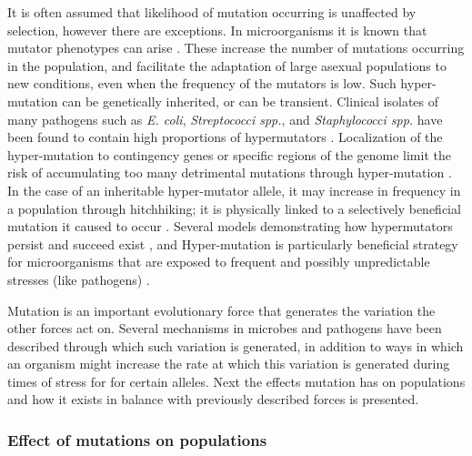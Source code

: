 It is often assumed that likelihood of mutation occurring is unaffected by selection, however there are exceptions.
In microorganisms it is known that mutator phenotypes can arise \parencite{Barrick2009}.
These increase the number of mutations occurring in the population, and facilitate the adaptation of large asexual populations to new conditions, even when the frequency of the mutators is low.
Such hyper-mutation can be genetically inherited, or can be transient.
Clinical isolates of many pathogens such as \textit{E. coli}, \textit{Streptococci spp.}, and \textit{Staphylococci spp.} have been found to contain high proportions of hypermutators \parencite{Jayaraman2011}.
Localization of the hyper-mutation to contingency genes or specific regions of the genome limit the risk of accumulating too many detrimental mutations through hyper-mutation \parencite{Jayaraman2011}.
In the case of an inheritable hyper-mutator allele, it may increase in frequency in a population through hitchhiking; it is physically linked to a selectively beneficial mutation it caused to occur \parencite{Giraud2001a}.
Several models demonstrating how hypermutators persist and succeed exist \parencite{Taddei1997,Tenaillon1999}, and Hyper-mutation is particularly beneficial strategy for microorganisms that are exposed to frequent and possibly unpredictable stresses (like pathogens) \parencite{DeVisser2002,Tanaka2003}.

Mutation is an important evolutionary force that generates the variation the other forces act on.
Several mechanisms in microbes and pathogens have been described through which such variation is generated, in addition to ways in which an organism might increase the rate at which this variation is generated during times of stress for for certain alleles.
Next the effects mutation has on populations and how it exists in balance with previously described forces is presented.

\subsubsection{Effect of mutations on populations}

